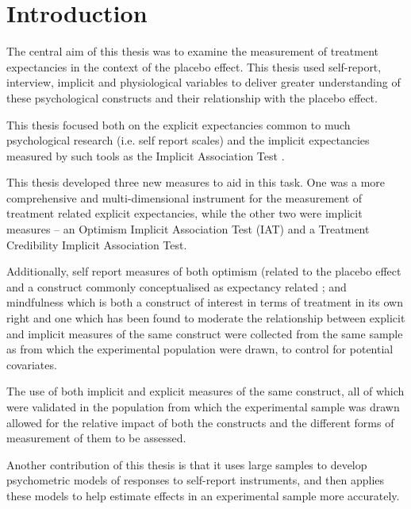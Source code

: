 
\chapter{Introduction}



The central aim of this thesis was to examine the measurement of treatment expectancies in the context of the placebo effect. This thesis used self-report, interview, implicit and physiological variables to deliver greater understanding of these psychological constructs and their relationship with the placebo effect.

This thesis focused both on the explicit expectancies common to much psychological research (i.e. self report scales) and the implicit expectancies measured by such tools as the Implicit Association Test \cite{Greenwald1998}. 

This thesis developed three new measures to aid in this task. One was a more comprehensive and multi-dimensional instrument for the measurement of treatment related explicit expectancies,  while the other two were implicit measures -- an Optimism Implicit Association Test (IAT) and a Treatment Credibility Implicit Association Test. 

Additionally, self report measures of both optimism (related to the placebo effect and a construct commonly conceptualised as expectancy related \cite{Carver2010}; and mindfulness which is both a construct of interest in terms of treatment in its own right \cite{kabat1982outpatient} and one which has been found to moderate the relationship between explicit and implicit measures of the same construct were collected from the same sample as from which the experimental population were drawn, to control for potential covariates. 

The use of both implicit and explicit measures of the same construct, all of which were validated in the population from which the experimental sample was drawn allowed for the relative impact of both the constructs and the different forms of measurement of them to be assessed. 


Another contribution of this thesis is that it uses large samples to develop psychometric models of responses to self-report instruments, and then applies these models to help estimate effects in an experimental sample more accurately. 





